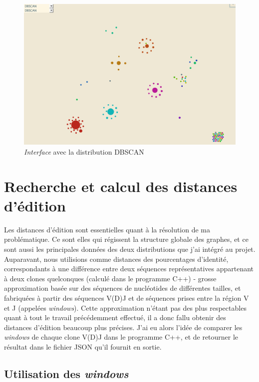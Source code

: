 \documentclass[pdftex,12pt,a4paper]{report}
\begin{document}
\begin{spacing}{1.2}
\begin{figure}[h!]
\begin{center}
	\includegraphics[scale=0.57]{img/DBSCAN-Ex.jpg}
\end{center}
\caption{\textit{Interface} avec la distribution DBSCAN}
\label{fig:distribution_dbscan}
\end{figure}

\chapter{Recherche et calcul des distances d'édition}

Les distances d'édition sont essentielles quant à la résolution de ma problématique. Ce sont elles qui régissent la structure globale des graphes, et ce sont aussi les principales données des deux distributions que j'ai intégré au projet.
\newline
Auparavant, nous utilisions comme distances des pourcentages d'identité, correspondants à une différence entre deux séquences représentatives appartenant à deux clones quelconques (calculé dans le programme C++) - grosse approximation basée sur des séquences de nucléotides de différentes tailles, et fabriquées à partir des séquences V(D)J et de séquences prises entre la région V et J (appelées \textit{windows}). Cette approximation n'étant pas des plus respectables quant à tout le travail précédemment effectué, il a donc fallu obtenir des distances d'édition beaucoup plus précises. J'ai eu alors l'idée de comparer les \textit{windows} de chaque clone V(D)J dans le programme C++, et de retourner le résultat dans le fichier JSON qu'il fournit en sortie.

\section{Utilisation des \textit{windows}}


\end{spacing}
\end{document}
